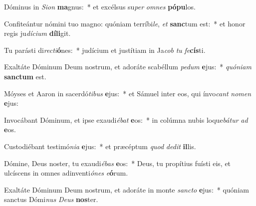 \item Dóminus in \textit{Si}\textit{on} \textbf{ma}gnus:~* et excélsus su\textit{per} \textit{om}\textit{nes} \textbf{pó}\textbf{pu}los.
\item Confiteántur nómini tuo magno: quóniam terríbi\textit{le}, \textit{et} \textbf{sanc}tum est:~* et honor regis ju\textit{dí}\textit{ci}\textit{um} \textbf{dí}\textbf{li}git.
\item Tu parásti di\textit{rec}\textit{ti}\textbf{ó}nes:~* judícium et justítiam in Ja\textit{cob} \textit{tu} \textit{fe}\textbf{cís}ti.
\item Exaltáte Dóminum Deum nostrum, et adoráte scabéllum \textit{pe}\textit{dum} \textbf{e}jus:~* \textit{quón}\textit{i}\textit{am} \textbf{sanc}\textbf{tum} est.
\item Móyses et Aaron in sacerdó\textit{ti}\textit{bus} \textbf{e}jus:~* et Sámuel inter eos, qui ínvo\textit{cant} \textit{no}\textit{men} \textbf{e}jus:
\item Invocábant Dóminum, et ipse exaudi\textit{é}\textit{bat} \textbf{e}os:~* in colúmna nubis loque\textit{bá}\textit{tur} \textit{ad} \textbf{e}os.
\item Custodiébant testimó\textit{ni}\textit{a} \textbf{e}jus:~* et præcéptum \textit{quod} \textit{de}\textit{dit} \textbf{il}lis.
\item Dómine, Deus noster, tu exaudi\textit{é}\textit{bas} \textbf{e}os:~* Deus, tu propítius fuísti eis, et ulcíscens in omnes adinventi\textit{ó}\textit{nes} \textit{e}\textbf{ó}rum.
\item Exaltáte Dóminum Deum nostrum, et adoráte in monte \textit{sanc}\textit{to} \textbf{e}jus:~* quóniam sanctus Dómi\textit{nus} \textit{De}\textit{us} \textbf{nos}ter.
